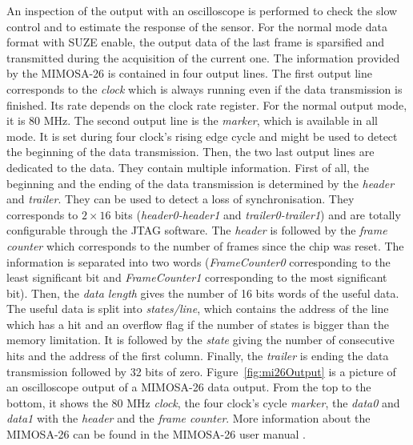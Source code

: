   An inspection of the output with an oscilloscope is performed to check the slow control and to estimate the response of the sensor.
  For the normal mode data format with SUZE enable, the output data of the last frame is sparsified and transmitted during the acquisition of the current one.
  The information provided by the MIMOSA-26 is contained in four output lines.
  The first output line corresponds to the \textit{clock} which is always running even if the data transmission is finished. 
  Its rate depends on the clock rate register. 
  For the normal output mode, it is 80 MHz.
  The second output line is the \textit{marker}, which is available in all mode.
  It is set during four clock's rising edge cycle and might be used to detect the beginning of the data transmission.
  Then, the two last output lines are dedicated to the data.
  They contain multiple information.
  First of all, the beginning and the ending of the data transmission is determined by the \textit{header} and \textit{trailer}.
  They can be used to detect a loss of synchronisation.
  They corresponds to $2 \times 16$ bits (\textit{header0-header1} and \textit{trailer0-trailer1}) and are totally configurable through the JTAG software.
  The \textit{header} is followed by the \textit{frame counter} which corresponds to the number of frames since the chip was reset. 
  The information is separated into two words (\textit{FrameCounter0} corresponding to the least significant bit and \textit{FrameCounter1} corresponding to the most significant bit).
  Then, the \textit{data length} gives the number of 16 bits words of the useful data. 
  The useful data is split into \textit{states/line}, which contains the address of the line which has a hit and an overflow flag if the number of states is bigger than the memory limitation.
  It is followed by the \textit{state} giving the number of consecutive hits and the address of the first column.
  Finally, the \textit{trailer} is ending the data transmission followed by 32 bits of zero.
  Figure~\ref{fig:mi26Output} is a picture of an oscilloscope output of a MIMOSA-26 data output. From the top to the bottom, it shows the 80 MHz \textit{clock}, the four clock's cycle \textit{marker}, the \textit{data0} and \textit{data1} with the \textit{header} and the \textit{frame counter}.
  More information about the MIMOSA-26 can be found in the MIMOSA-26 user manual \cite{manualMi26}.

